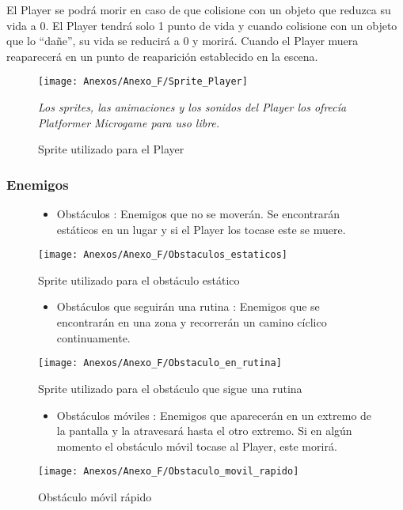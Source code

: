 El Player \footnotemark se podrá morir en caso de que colisione con un objeto que reduzca su vida a 0. El Player tendrá solo 1 punto de vida y cuando colisione con un objeto que lo “dañe”, su vida se reducirá a 0 y morirá. Cuando el Player muera reaparecerá en un punto de reaparición establecido en la escena.

\begin{figure}[h]
\centering
\texttt{[image: Anexos/Anexo\_F/Sprite\_Player]}
\caption{Sprite utilizado para el Player}
\raggedright
\textit{Los sprites, las animaciones y los sonidos del Player los ofrecía Platformer Microgame para uso libre.}
\end{figure}
\clearpage

\subsubsection{Enemigos}
\begin{figure}[h]
\begin{itemize}
\item
Obstáculos \footnotemark : Enemigos que no se moverán. Se encontrarán estáticos en un lugar y si el Player los tocase este se muere.
\end{itemize}
\centering
\texttt{[image: Anexos/Anexo\_F/Obstaculos\_estaticos]}
\caption{Sprite utilizado para el obstáculo estático}
\end{figure}

\begin{figure}[h]
\begin{itemize}
\item
Obstáculos que seguirán una rutina \footnotemark : Enemigos que se encontrarán en una zona y recorrerán un camino cíclico continuamente.
\end{itemize}
\centering
\texttt{[image: Anexos/Anexo\_F/Obstaculo\_en\_rutina]}
\caption{Sprite utilizado para el obstáculo que sigue una rutina}
\end{figure}

\begin{figure}[h]
\begin{itemize}
\item
Obstáculos móviles \footnotemark : Enemigos que aparecerán en un extremo de la pantalla y la atravesará hasta el otro extremo. Si en algún momento el obstáculo móvil tocase al Player, este morirá.
\end{itemize}
\centering
\texttt{[image: Anexos/Anexo\_F/Obstaculo\_movil\_rapido]}
\caption{Obstáculo móvil rápido}
\end{figure}

